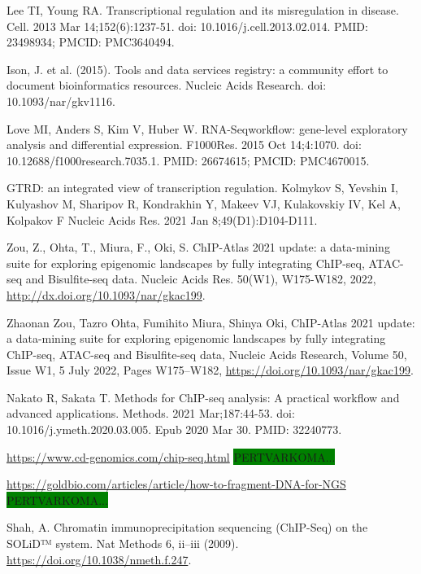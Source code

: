 \documentclass[12pt]{article}
\begin{document}

\begin{thebibliography}{99}

 Lee TI, Young RA. Transcriptional regulation and its
misregulation in disease. Cell. 2013 Mar 14;152(6):1237-51.
doi: 10.1016/j.cell.2013.02.014. PMID: 23498934; PMCID: PMC3640494.

 Ison, J. et al. (2015). Tools and data services registry: a
community effort to document bioinformatics resources. Nucleic Acids Research.
doi: 10.1093/nar/gkv1116.

 Love MI, Anders S, Kim V, Huber W. RNA-Seqworkflow:
gene-level exploratory analysis and differential expression. F1000Res.
2015 Oct 14;4:1070. doi: 10.12688/f1000research.7035.1. PMID: 26674615;
PMCID: PMC4670015.

 GTRD: an integrated view of transcription regulation.
Kolmykov S, Yevshin I, Kulyashov M, Sharipov R, Kondrakhin Y, Makeev VJ,
Kulakovskiy IV, Kel A, Kolpakov F Nucleic Acids Res. 2021 Jan
8;49(D1):D104-D111.

 Zou, Z., Ohta, T., Miura, F., Oki, S. ChIP-Atlas 2021
update: a data-mining suite for exploring epigenomic landscapes by fully
integrating ChIP-seq, ATAC-seq and Bisulfite-seq data. Nucleic Acids Res.
50(W1), W175-W182, 2022, \newline
\url{http://dx.doi.org/10.1093/nar/gkac199}.

 Zhaonan Zou, Tazro Ohta, Fumihito Miura, Shinya Oki,
ChIP-Atlas 2021 update: a data-mining suite for exploring epigenomic landscapes
by fully integrating ChIP-seq, ATAC-seq and Bisulfite-seq data, Nucleic Acids
Research, Volume 50, Issue W1, 5 July 2022, Pages W175–W182,
\url{https://doi.org/10.1093/nar/gkac199}.

 Nakato R, Sakata T. Methods for ChIP-seq analysis: A
practical workflow and advanced applications. Methods. 2021 Mar;187:44-53.
doi: 10.1016/j.ymeth.2020.03.005. Epub 2020 Mar 30. PMID: 32240773.

 \url{https://www.cd-genomics.com/chip-seq.html}
\colorbox{green}{PERTVARKOMA...}

\url{https://goldbio.com/articles/article/how-to-fragment-DNA-for-NGS}
\colorbox{green}{PERTVARKOMA...}

 Shah, A. Chromatin immunoprecipitation sequencing (ChIP-Seq)
on the SOLiD™ system. Nat Methods 6, ii–iii (2009).
\url{https://doi.org/10.1038/nmeth.f.247}.


\end{thebibliography}
\end{document}
